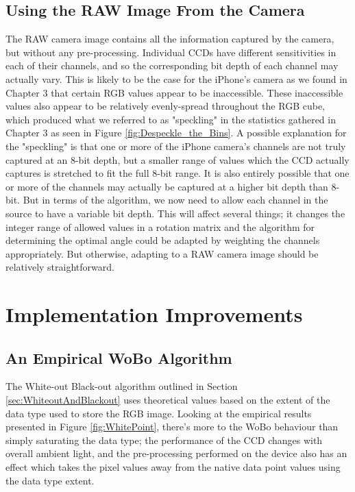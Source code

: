 \subsection{Using the RAW Image From the Camera}\label{sec:UsingTheRAWImageFromTheCamera}
The RAW camera image contains all the information captured by the camera, but without any pre-processing. Individual CCDs have different sensitivities in each of their channels, and so the corresponding bit depth of each channel may actually vary. This is likely to be the case for the iPhone's camera as we found in Chapter 3 that certain RGB values appear to be inaccessible. These inaccessible values also appear to be relatively evenly-spread throughout the RGB cube, which produced what we referred to as "speckling" in the statistics gathered in Chapter 3 as seen in Figure \ref{fig:Despeckle_the_Bins}. 
A possible explanation for the "speckling" is that one or more of the iPhone camera's channels are not truly captured at an 8-bit depth, but a smaller range of values which the CCD actually captures is stretched to fit the full 8-bit range. It is also entirely possible that one or more of the channels may actually be captured at a higher bit depth than 8-bit. But in terms of the algorithm, we now need to allow each channel in the source to have a variable bit depth. This will affect several things; it changes the integer range of allowed values in a rotation matrix and the algorithm for determining the optimal angle could be adapted by weighting the channels appropriately. But otherwise, adapting to a RAW camera image should be relatively straightforward.

\section{Implementation Improvements}\label{sec:ImplementationImprovements}

\subsection{An Empirical WoBo Algorithm}\label{sec:EmpicialWoBoAlgorithm}
The White-out Black-out algorithm outlined in Section \ref{sec:WhiteoutAndBlackout} uses theoretical values based on the extent of the data type used to store the RGB image. Looking at the empirical results presented in Figure \ref{fig:WhitePoint}, there's more to the WoBo behaviour than simply saturating the data type; the performance of the CCD changes with overall ambient light, and the pre-processing performed on the device also has an effect which takes the pixel values away from the native data point values using the data type extent. 

